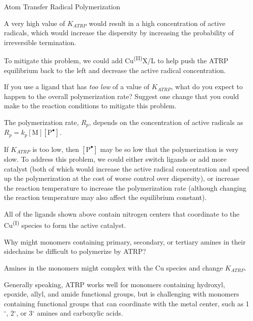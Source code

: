 \begin{activity}{Atom Transfer Radical Polymerization}
\begin{ctqs}
		\begin{solution}[1.25in]
			A very high value of $K_{ATRP}$ would result in a high concentration of active radicals, which would increase the dispersity by increasing the probability of irreversible termination.
			
			To mitigate this problem, we could add Cu\textsuperscript{(II)}X/L to help push the ATRP equilibrium back to the left and decrease the active radical concentration.
		\end{solution}
	
	\question If you use a ligand that has \emph{too low} of a value of $K_{ATRP}$, what do you expect to happen to the overall polymerization rate?  Suggest one change that you could make to the reaction conditions to mitigate this problem. \label{\labelbase:ctq:lowK}
	
		\begin{solution}[1.25in]
			The polymerization rate, $R_p$, depends on the concentration of active radicals as $R_p = k_p[\text{M}][\text{P}^\bullet]$.
			
			If $K_{ATRP}$ is too low, then $[\text{P}^\bullet]$ may be so low that the polymerization is very slow.  To address this problem, we could either switch ligands or add more catalyst (both of which would increase the active radical concentration and speed up the polymerization at the cost of worse control over dispersity), or increase the reaction temperature to increase the polymerization rate (although changing the reaction temperature may also affect the equilibrium constant).
		\end{solution}
	
	\question All of the ligands shown above contain nitrogen centers that coordinate to the Cu\textsuperscript{(I)} species to form the active catalyst.
	
		Why might monomers containing primary, secondary, or tertiary amines in their sidechains be difficult to polymerize by ATRP?  
	
		\begin{solution}[1.25in]
			Amines in the monomers might complex with the Cu species and change $K_{ATRP}$.
			
			Generally speaking, ATRP works well for monomers containing hydroxyl, epoxide, allyl, and amide functional groups, but is challenging with monomers containing functional groups that can coordinate with the metal center, such as 1$^\circ$, 2$^\circ$, or 3$^\circ$ amines and carboxylic acids.
		\end{solution}
	

\end{ctqs}
\end{activity}
